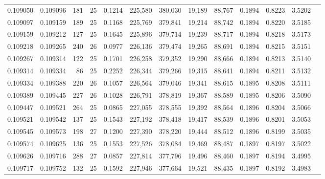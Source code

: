 \begin{tabular}{rrrrrrrrrrrrr}
0.109050 & 0.109096 & 181 &  25 &                                     0.1214 & 225,580 & 380,030 &  19,189 &  88,767 & 0.1894 & 0.8223 & 3.5202 \\
0.109097 & 0.109159 & 189 &  25 &                                     0.1168 & 225,769 & 379,841 &  19,214 &  88,742 & 0.1894 & 0.8220 & 3.5185 \\
0.109159 & 0.109212 & 127 &  25 &                                     0.1645 & 225,896 & 379,714 &  19,239 &  88,717 & 0.1894 & 0.8218 & 3.5173 \\
0.109218 & 0.109265 & 240 &  26 &                                     0.0977 & 226,136 & 379,474 &  19,265 &  88,691 & 0.1894 & 0.8215 & 3.5151 \\
0.109267 & 0.109314 & 122 &  25 &                                     0.1701 & 226,258 & 379,352 &  19,290 &  88,666 & 0.1894 & 0.8213 & 3.5140 \\
0.109314 & 0.109334 &  86 &  25 &                                     0.2252 & 226,344 & 379,266 &  19,315 &  88,641 & 0.1894 & 0.8211 & 3.5132 \\
0.109334 & 0.109388 & 220 &  26 &                                     0.1057 & 226,564 & 379,046 &  19,341 &  88,615 & 0.1895 & 0.8208 & 3.5111 \\
0.109389 & 0.109445 & 227 &  26 &                                     0.1028 & 226,791 & 378,819 &  19,367 &  88,589 & 0.1895 & 0.8206 & 3.5090 \\
0.109447 & 0.109521 & 264 &  25 &                                     0.0865 & 227,055 & 378,555 &  19,392 &  88,564 & 0.1896 & 0.8204 & 3.5066 \\
0.109521 & 0.109542 & 137 &  25 &                                     0.1543 & 227,192 & 378,418 &  19,417 &  88,539 & 0.1896 & 0.8201 & 3.5053 \\
0.109545 & 0.109573 & 198 &  27 &                                     0.1200 & 227,390 & 378,220 &  19,444 &  88,512 & 0.1896 & 0.8199 & 3.5035 \\
0.109574 & 0.109625 & 136 &  25 &                                     0.1553 & 227,526 & 378,084 &  19,469 &  88,487 & 0.1897 & 0.8197 & 3.5022 \\
0.109626 & 0.109716 & 288 &  27 &                                     0.0857 & 227,814 & 377,796 &  19,496 &  88,460 & 0.1897 & 0.8194 & 3.4995 \\
0.109717 & 0.109752 & 132 &  25 &                                     0.1592 & 227,946 & 377,664 &  19,521 &  88,435 & 0.1897 & 0.8192 & 3.4983 \\

\end{tabular}
